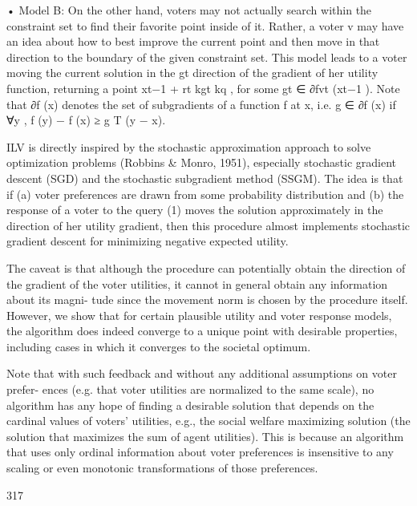 \documentclass[10pt]{article}
\begin{document}
\begin{ReviewVerbatim}
• Model B:       On the other hand, voters may not actually search within the constraint set
  to find their favorite point inside of it. Rather, a voter v may have an idea about how
  to best improve the current point and then move in that direction to the boundary of
  the given constraint set. This model leads to a voter moving the current solution in the
                                                                                           gt
  direction of the gradient of her utility function, returning a point xt−1 + rt
                                                                                         kgt kq , for some
  gt ∈ ∂fvt (xt−1 ). Note that ∂f (x) denotes the set of subgradients of a function f at x, i.e.
  g ∈ ∂f (x) if ∀y , f (y) − f (x) ≥ g T (y − x).

   ILV is directly inspired by the stochastic approximation approach to solve optimization
problems (Robbins & Monro, 1951), especially stochastic gradient descent (SGD) and the
stochastic subgradient method (SSGM). The idea is that if (a) voter preferences are drawn
from some probability distribution and (b) the response of a voter to the query (1) moves the
solution approximately in the direction of her utility gradient, then this procedure              almost
implements stochastic gradient descent for minimizing negative expected utility.

   The caveat is that although the procedure can potentially obtain the direction of the
gradient of the voter utilities, it cannot in general obtain any information about its magni-
tude since the movement norm is chosen by the procedure itself. However, we show that for
certain plausible utility and voter response models, the algorithm does indeed converge to a
unique point with desirable properties, including cases in which it converges to the societal
optimum.

   Note that with such feedback and without any additional assumptions on voter prefer-
ences (e.g. that voter utilities are normalized to the same scale), no algorithm has any hope
of finding a desirable solution that depends on the cardinal values of voters' utilities, e.g., the
social welfare maximizing solution (the solution that maximizes the sum of agent utilities).
This is because an algorithm that uses only ordinal information about voter preferences is
insensitive to any scaling or even monotonic transformations of those preferences.



                                                 317


\end{ReviewVerbatim}
\end{document}
